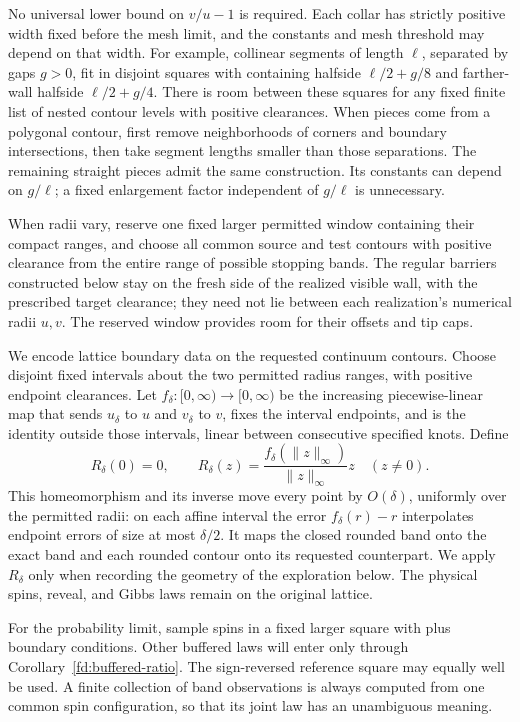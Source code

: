 \begin{remark}\label{if:thin-collars}
No universal lower bound on $v/u-1$ is required. Each collar has
strictly positive width fixed before the mesh limit, and the constants
and mesh threshold may depend on that width. For example, collinear
segments of length $\ell$, separated by gaps $g>0$, fit in disjoint
squares with containing halfside $\ell/2+g/8$ and farther-wall
halfside $\ell/2+g/4$. There is room between these squares for any
fixed finite list of nested contour levels with positive clearances.
When pieces come from a polygonal contour, first remove neighborhoods
of corners and boundary intersections, then take segment lengths
smaller than those separations. The remaining straight pieces admit
the same construction. Its constants can depend on $g/\ell$; a
fixed enlargement factor independent of $g/\ell$ is unnecessary.
\end{remark}

When radii vary, reserve one fixed larger permitted window containing
their compact ranges, and choose all common source and test contours
with positive clearance from the entire range of possible stopping
bands.  The regular barriers constructed below stay on the fresh side
of the realized visible wall, with the prescribed target clearance;
they need not lie between each realization's numerical radii $u,v$.
The reserved window provides room for their offsets and tip caps.

We encode lattice boundary data on the requested continuum contours.
Choose disjoint fixed intervals about the two permitted radius ranges,
with positive endpoint clearances. Let $f_\delta:[0,\infty)\to[0,\infty)$
be the increasing piecewise-linear map that sends $u_\delta$ to $u$ and
$v_\delta$ to $v$, fixes the interval endpoints, and is the identity
outside those intervals, linear between consecutive specified knots.
Define
\[
 R_\delta(0)=0,\qquad
 R_\delta(z)=\frac{f_\delta(\|z\|_\infty)}{\|z\|_\infty}z
 \quad(z\ne0).
\]
This homeomorphism and its inverse move every point by $O(\delta)$,
uniformly over the permitted radii: on each affine interval the error
$f_\delta(r)-r$ interpolates endpoint errors of size at most
$\delta/2$. It maps the closed rounded band onto the exact band and
each rounded contour onto its requested counterpart. We apply
$R_\delta$ only when recording the geometry of the exploration below.
The physical spins, reveal, and Gibbs laws remain on the original lattice.

For the probability limit, sample spins in a fixed larger square with
plus boundary conditions.  Other buffered laws will enter only through
Corollary~\ref{fd:buffered-ratio}.  The sign-reversed reference square may
equally well be used.  A finite collection of band observations is always
computed from one common spin configuration, so that its joint law has
an unambiguous meaning.

